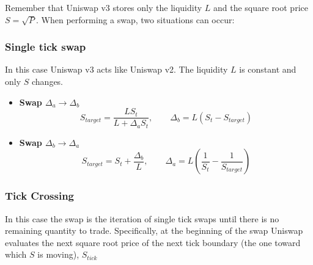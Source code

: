 \documentclass[a4paper,11pt]{article}
\begin{document}
Remember that Uniswap v3 stores only the liquidity $L$ and the square root price $S=\sqrt{P}$. When performing a swap, two situations can occur:

\subsubsection{Single tick swap} 
In this case Uniswap v3 acts like Uniswap v2. The liquidity $L$ is constant and only $S$ changes.

\begin{itemize}
    \item \textbf{Swap $\Delta_a \to \Delta_b$ }
    \begin{equation}
        S_{target}= \frac{L S_t}{L + \Delta_aS_t}, \qquad \Delta_b = L(S_t -S_{target})
    \label{1}
    \end{equation}
    \item \textbf{Swap $\Delta_b \to \Delta_a$ }
    \begin{equation}
        S_{target} = S_t + \frac{\Delta_b}{L}, \qquad \Delta_a = L\left(\frac{1}{S_t}-\frac{1}{S_{target}}\right)
        \label{2}
    \end{equation}
\end{itemize}

\subsubsection{Tick Crossing}
In this case the swap is the iteration of single tick swaps until there is no remaining quantity to trade. Specifically, at the beginning of the swap Uniswap evaluates the next square root price of the next tick boundary (the one toward which $S$ is moving), $S_{tick}$
\end{document}
